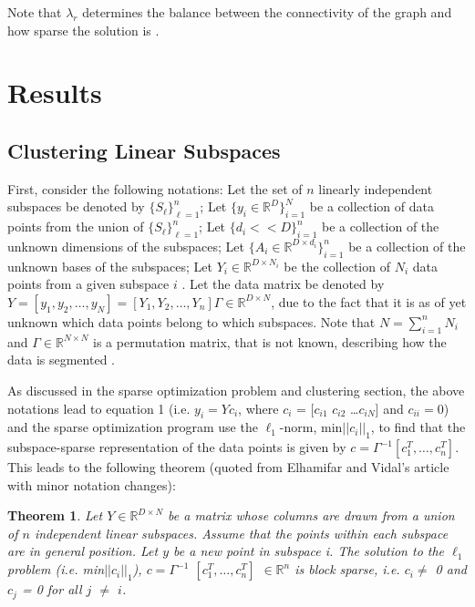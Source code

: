 \documentclass{article}
\newcommand{\R}{\mathbb{R}}
\newtheorem{theorem}{Theorem}[section]
\begin{document}
Note that $\lambda_r$ determines the balance between the connectivity of the graph and how sparse the solution is \cite{elhamifar2012sparse}.

\section{Results}

\subsection{Clustering Linear Subspaces}
\hspace{\parindent}First, consider the following notations: Let the set of $n$ linearly independent subspaces be denoted by $\{S_\ell\}_{\ell=1}^n$; Let $\{y_i \in \R^D\}_{i=1}^N$ be a collection of data points from the union of $\{S_\ell\}_{\ell=1}^n$; Let $\{d_i << D\}_{i=1}^n$ be a collection of the unknown dimensions of the subspaces; Let $\{A_i \in  \R^{D \times d_i}\}_{i = 1}^n$ be a collection of the unknown bases of the subspaces; Let $Y_i \in \R^{D \times N_i}$ be the collection of $N_i$ data points from a given subspace $i$ \cite{SSC-CVPR09-Ehsan}. Let the data matrix be denoted by $Y = [y_1, y_2, \dots, y_N]=[Y_1, Y_2, \dots, Y_n]\Gamma \in \R^{D\times N}$, due to the fact that it is as of yet unknown which data points belong to which subspaces. Note that $N = \sum\limits_{i=1}^n N_i $ and $\Gamma \in \R^{N \times N}$ is a permutation matrix, that is not known, describing how the data is segmented \cite{SSC-CVPR09-Ehsan}.

As discussed in the sparse optimization problem and clustering section, the above notations lead to equation 1 (i.e. $y_i = Yc_i$, where $c_i$ = [$c_{i1}$ $c_{i2}$ \dots $c_{iN}$] and $c_{ii} = 0$) and the sparse optimization program use the $\ell_1$-norm, min$||c_i||_1$, to find that the subspace-sparse representation of the data points is given by $c = \Gamma^{-1}[c_1^T, \dots, c_n^T]$. This leads to the following theorem (quoted from Elhamifar and Vidal's article \cite{SSC-CVPR09-Ehsan} with minor notation changes):

\begin{theorem}
Let $Y \in \R^{D \times N}$ be a matrix whose columns are drawn from a union of $n$ independent linear subspaces. Assume that the points within each subspace are in general position. Let $y$ be a new point in subspace i. The solution to the $\ell_1$ problem (i.e. min$||c_i||_1$), $c = \Gamma^{-1}$ $\left[ c_1^T, \dots, c_n^T \right]$ $\in \R^n$ is block sparse, i.e. $c_i \neq$ 0 and $c_j$ = 0 for all $j$ $\neq$ $i$. \cite{SSC-CVPR09-Ehsan}
\end{theorem}
\end{document}
